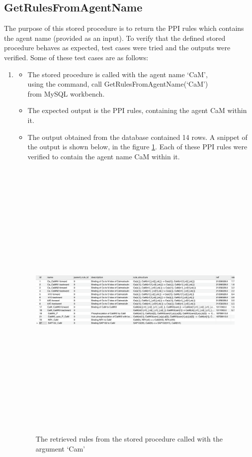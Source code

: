 \documentclass[msc,deptreport,ai]{infthesis}      %
\begin{document}
\subsection{GetRulesFromAgentName}
The purpose of this stored procedure is to return the PPI rules which contains the agent name (provided as an input). To verify that the defined stored procedure behaves as expected, test cases were tried and the outputs were verified. Some of these test cases are as follows: 
\begin{enumerate}
	\item 
	\begin{itemize}
		\item 	The stored procedure is called with the agent name `CaM',\\
		using the command, call GetRulesFromAgentName(`CaM') \\
		 from MySQL workbench.
		 \item 	The expected output is the PPI rules, containing the agent CaM within it.
		 \item 	The output obtained from the database contained 14 rows. A snippet of the output is shown below, in the figure \ref{fig:AgentNameOutput1}. Each of these PPI rules were verified to contain the agent name CaM within it.\\
	\end{itemize}	
	\begin{figure}[H]
		\centering
		\captionsetup{justification=centering}
		\includegraphics[width=\linewidth,height=14cm,keepaspectratio]{AgentNameOutput1.png}	
		\caption{The retrieved rules from the stored procedure called with the argument `Cam'}
		\label{fig:AgentNameOutput1}		
	\end{figure}


\end{enumerate}
\end{document}
